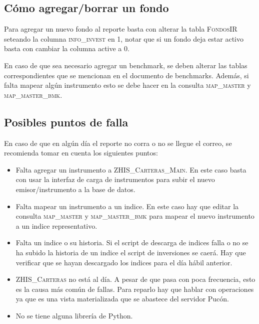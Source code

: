 \documentclass{article}
\begin{document}
\subsection{Cómo agregar/borrar un fondo}
Para agregar un nuevo fondo al reporte basta con alterar la tabla \textsc{FondosIR} seteando la columna \textsc{info\_invest} en 1, notar que si un fondo deja estar activo basta con cambiar la columna active a 0. 

En caso de que sea necesario agregar un benchmark, se deben alterar las tablas correspondientes que se mencionan en el documento de benchmarks. Además, si falta mapear algún instrumento esto se debe hacer en la consulta \textsc{map\_master} y \textsc{map\_master\_bmk}.


\subsection{Posibles puntos de falla}


En caso de que en algún día el reporte no corra o no se llegue el correo, se recomienda tomar en cuenta los siguientes puntos:
\begin{itemize}

\item Falta agregar un instrumento a \textsc{ZHIS\_Carteras\_Main}. En este caso basta con usar la interfaz de carga de instrumentos para subir el nuevo emisor/instrumento a la base de datos.

\item Falta mapear un instrumento a un indice. En este caso hay que editar la consulta \textsc{map\_master} y \textsc{map\_master\_bmk} para mapear el nuevo instrumento a un indice representativo.

\item Falta un indice o su historia. Si el script de descarga de indices falla o no se ha subido la historia de un indice el script de inversiones se caerá. Hay que verificar que se hayan descargado los indices para el día hábil anterior. 

\item \textsc{ZHIS\_Carteras} no está al día. A pesar de que pasa con poca frecuencia, esto es la causa más común de fallas. Para reparlo hay que hablar con operaciones ya que es una vista materializada que se abastece del servidor Pucón.

\item No se tiene alguna librería de Python.
\end{itemize}
\end{document}
